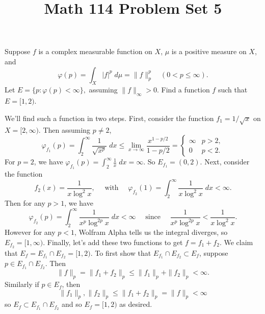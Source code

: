 \documentclass[11pt,letterpaper]{article}
\title{\textbf{Math 114 Problem Set 5}}
\begin{document}
\maketitle


\begin{problem}
    Suppose $f$ is a complex measurable function on $X$, $\mu$ is a positive measure on $X$, and 
    \[
        \varphi(p)=\int_X |f|^p\;d\mu = \|f\|^p_p\quad (0< p\leq \infty)
    .\] 
    Let $E=\{p : \varphi(p)<\infty\},$ assuming $\|f\|_\infty > 0$. Find a function $f$ such that $E = [1,2)$.
\end{problem}

\begin{solution}
    We'll find such a function in two steps. First, consider the function $f_1 = 1 /\sqrt{x}$ on $X=[2,\infty)$. Then assuming $p\neq 2$,
    \[
        \varphi_{f_1}(p)=\int_2^\infty \frac{1}{\sqrt{x^{p}}}\;dx \leq \lim_{x\to \infty} \frac{x^{1-p/2}}{1-p/2} = \begin{cases}
            \infty & p > 2,\\
            0 & p < 2.
        \end{cases}
    \]
    For $p=2$, we have $\varphi_{f_1}(p)=\int^\infty_2 \frac{1}{x}\;dx =\infty$. So $E_{f_1}=(0,2)$. Next, consider the function
    \[
        f_2(x) = \frac{1}{x\log^2 x}, \quad\text{ with }\quad \varphi_{f_2}(1)=\int^\infty_2 \frac{1}{x\log^2 x}\;dx < \infty 
    .\]
    Then for any $p > 1$, we have
    \[
        \varphi_{f_2}(p)=\int_2^\infty \frac{1}{x^p\log^{2p}x}\;dx < \infty \quad \text{ since }\quad \frac{1}{x^p\log^{2p}x} < \frac{1}{x\log^2 x}
    .\]      
    \quad However for any $p < 1$, Wolfram Alpha tells us the integral diverges, so $E_{f_2}=[1,\infty)$. Finally, let's add these two functions to get $f=f_1+f_2$. We claim that $E_{f} = E_{f_1} \cap E_{f_2} = [1,2)$. To first show that $E_{f_1}\cap E_{f_2}\subset E_{f}$, suppose $p\in E_{f_1}\cap E_{f_2}$. Then 
    \[
        \|f\|_p = \|f_1+f_2\|_p \leq \|f_1\|_p+\|f_2\|_p < \infty
    .\]  
    Similarly if $p\in E_f$, then
    \[
        \|f_1\|_p,\|f_2\|_p \leq \|f_1+f_2\|_p = \|f\|_p < \infty
    \] 
    so $E_f \subset E_{f_1}\cap E_{f_2}$ and so $E_f = [1,2)$ as desired. 
\end{solution}
\end{document}
